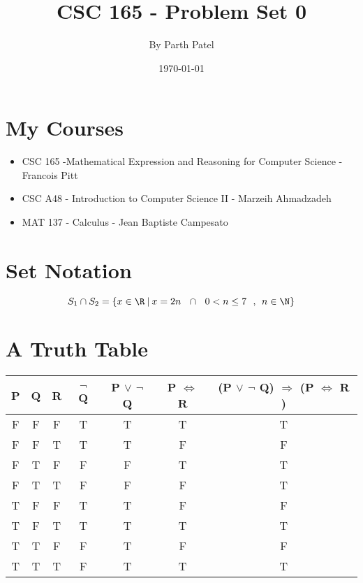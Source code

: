 \documentclass[12pt]{article}
\title{CSC 165 - Problem Set 0}
\author{By Parth Patel}
\date{\today}
\begin{document}
\maketitle

\section*{My Courses}
\begin{itemize}
\item CSC 165 -Mathematical Expression and Reasoning for Computer Science - Francois Pitt
\item CSC A48 - Introduction to Computer Science  II - Marzeih Ahmadzadeh
\item MAT 137 - Calculus - Jean Baptiste Campesato
\end{itemize}

\bigskip
\section*{Set Notation}

\[
S_1 \cap S_2 = \{ x \in \R  \>| \> x = 2n\> \> \> \cap \> \> \> 0 < n \leq 7 \> \> \> , \> \> n \in \N\}
\]

\bigskip
\section*{A Truth Table}
\bigskip
\begin{tabular}{c c c c c c c}  %

P & Q & R & $\neg$ Q & P $\lor$ $\neg$ Q & P $\Leftrightarrow$ R &(P $\lor$ $\neg$ Q) $\Rightarrow$ (P $\Leftrightarrow$ R ) \\

\hline


F & F & F & T & T & T & T \\
F & F & T & T & T & F & F \\
F & T & F & F & F & T & T \\
F & T & T & F & F & F & T \\
T & F & F & T & T & F & F \\
T & F & T & T & T & T & T \\
T & T & F & F & T & F & F \\
T & T & T & F & T & T & T \\
\end{tabular}
\end{document}
